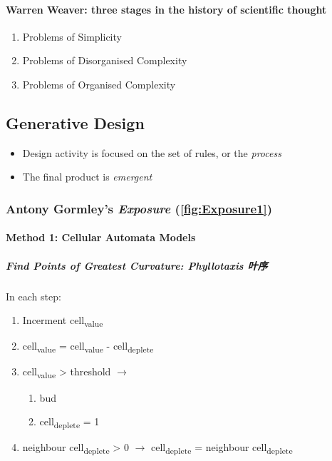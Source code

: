 \documentclass[a4paper, openany]{book}
\begin{document}
\paragraph{Warren Weaver: three stages in the history of scientific thought}

\begin{enumerate}
  \item Problems of Simplicity
  \item Problems of Disorganised Complexity
  \item Problems of Organised Complexity
\end{enumerate}

\subsection{Generative Design}

\begin{itemize}
  \item Design activity is focused on the set of rules, or the \textit{process}
  \item The final product is \textit{emergent}
\end{itemize}

\subsubsection{Antony Gormley's \textit{Exposure} (\textbf{\cref{fig:Exposure1}})}

\paragraph{Method 1: Cellular Automata Models}

\subparagraph{Find Points of Greatest Curvature: Phyllotaxis 叶序}

In each step:
\begin{enumerate}
  \item Incerment cell\textsubscript{value}
  \item cell\textsubscript{value} = cell\textsubscript{value} - cell\textsubscript{deplete}
  \item cell\textsubscript{value} > threshold $\rightarrow$
  \begin{enumerate}
    \item bud
    \item cell\textsubscript{deplete} = 1
  \end{enumerate}
  \item neighbour cell\textsubscript{deplete} > 0 $\rightarrow$ cell\textsubscript{deplete} = neighbour cell\textsubscript{deplete}
\end{enumerate}
\end{document}
